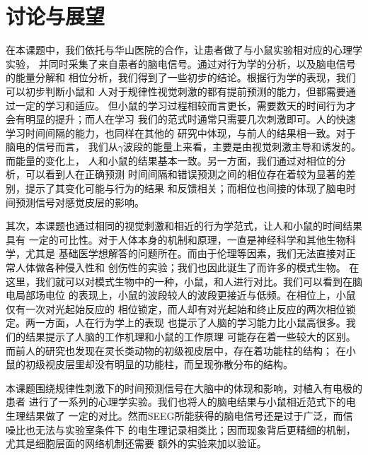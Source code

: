 \chapter{讨论与展望}

在本课题中，我们依托与华山医院的合作，让患者做了与小鼠实验相对应的心理学实验，
并同时采集了来自患者的脑电信号。通过对行为学的分析，以及脑电信号的能量分解和
相位分析，我们得到了一些初步的结论。根据行为学的表现，我们可以初步判断小鼠和
人对于规律性视觉刺激的都有提前预测的能力，但都需要通过一定的学习和适应。
但小鼠的学习过程相较而言更长，需要数天的时间行为才会有明显的提升；而人在学习
我们的范式时通常只需要几次刺激即可。人的快速学习时间间隔的能力，也同样在其他的
研究中体现，与前人的结果相一致\cite{simen2011model}。对于脑电的信号而言，
我们从\(\gamma\)波段的能量上来看，主要是由视觉刺激主导和诱发的。而能量的变化上，
人和小鼠的结果基本一致。另一方面，我们通过对相位的分析，可以看到人在正确预测
时间间隔和错误预测之间的相位存在着较为显著的差别，提示了其变化可能与行为的结果
和反馈相关；而相位也间接的体现了脑电时间预测信号对感觉皮层的影响。

其次，本课题也通过相同的视觉刺激和相近的行为学范式，让人和小鼠的时间结果具有
一定的可比性。对于人体本身的机制和原理，一直是神经科学和其他生物科学，尤其是
基础医学想解答的问题所在。而由于伦理等因素，我们无法直接对正常人体做各种侵入性和
创伤性的实验；我们也因此诞生了而许多的模式生物。
在这里，我们就可以对模式生物中的一种，小鼠，和人进行对比。我们可以看到在脑电局部场电位
的表现上，小鼠的波段较人的波段更接近与低频。在相位上，小鼠仅有一次对光起始反应的
相位锁定，而人却有对光起始和终止反应的两次相位锁定。两一方面，人在行为学上的表现
也提示了人脑的学习能力比小鼠高很多。我们的结果提示了人脑的工作机理和小鼠的工作原理
可能存在着一些较大的区别。
而前人的研究也发现在灵长类动物的初级视皮层中，存在着功能柱的结构\cite{}；
在小鼠的初级视皮层里却没有明显的功能柱，而呈现弥散分布的结构\cite{}。

本课题围绕规律性刺激下的时间预测信号在大脑中的体现和影响，对植入有电极的患者
进行了一系列的心理学实验。我们也将人的脑电结果与小鼠相近范式下的电生理结果做了
一定的对比。然而SEEG所能获得的脑电信号还是过于广泛，而信噪比也无法与实验室条件下
的电生理记录相类比；因而现象背后更精细的机制，尤其是细胞层面的网络机制还需要
额外的实验来加以验证。
